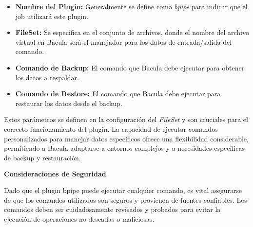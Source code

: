 \begin{itemize}
    \item \textbf{Nombre del Plugin:} Generalmente se define como \textit{bpipe} para indicar que el job utilizará este plugin.
    \item \textbf{FileSet:} Se especifica en el conjunto de archivos, donde el nombre del archivo virtual en Bacula será el manejador para los datos de entrada/salida del comando.
    \item \textbf{Comando de Backup:} El comando que Bacula debe ejecutar para obtener los datos a respaldar.
    \item \textbf{Comando de Restore:} El comando que Bacula debe ejecutar para restaurar los datos desde el backup.
\end{itemize}

Estos parámetros se definen en la configuración del \textit{FileSet} y son cruciales para el correcto funcionamiento del plugin. La capacidad de ejecutar comandos personalizados para manejar datos específicos ofrece una flexibilidad considerable, permitiendo a Bacula adaptarse a entornos complejos y a necesidades específicas de backup y restauración.

\textbf{Consideraciones de Seguridad}

Dado que el plugin bpipe puede ejecutar cualquier comando, es vital asegurarse de que los comandos utilizados son seguros y provienen de fuentes confiables. Los comandos deben ser cuidadosamente revisados y probados para evitar la ejecución de operaciones no deseadas o maliciosas.
